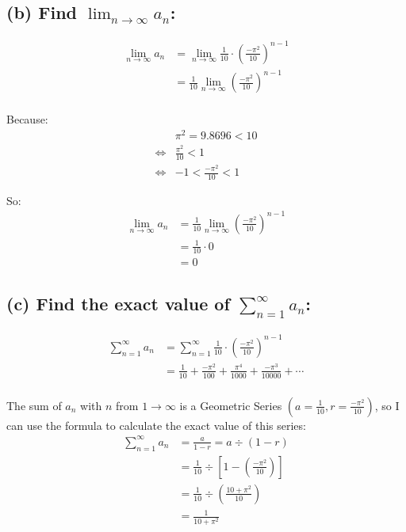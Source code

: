 \documentclass[12pt]{article}
\begin{document}
\subsection*{(b) Find $\displaystyle \lim_{n \rightarrow \infty} a_n$:}
\begin{align*}
    \lim_{n\to \infty} a_n &= \lim_{n\to \infty} \frac{1}{10}\cdot \left(\frac{-\pi^2}{10} \right)^{n-1} \\
    &=\frac{1}{10} \lim_{n\to \infty} \left(\frac{-\pi^2}{10} \right)^{n-1} \\
\end{align*}

Because:
\begin{align*}
    &\pi^2 = 9.8696 < 10\\
    \Longleftrightarrow & \frac{\pi^2}{10} < 1 \\
    \Longleftrightarrow & -1<\frac{-\pi^2}{10} < 1
\end{align*}

So:
\begin{align*}
    \lim_{n\to \infty} a_n &= 
    \frac{1}{10} \lim_{n\to \infty} \left(\frac{-\pi^2}{10} \right)^{n-1} \\
    &= \frac{1}{10}\cdot 0 \\
    &= 0
\end{align*}











\subsection*{(c) Find the exact value of $\displaystyle \sum_{n=1}^{\infty} a_n$:}
\begin{align*}
    \sum_{n=1}^{\infty} a_n
    &= \sum_{n=1}^{\infty} \frac{1}{10}\cdot \left( \frac{-\pi^2}{10} \right)^{n-1} \\
    &= \frac{1}{10} + \frac{-\pi^2}{100}+ \frac{\pi^4}{1000}+ \frac{-\pi^3}{10000}+ \cdots\\
\end{align*}

The sum of $a_n$ with $n$ from $1\to \infty$ is a Geometric Series $\left(a= \frac{1}{10}, r=\frac{-\pi^2}{10}\right)$, so I can use the formula to calculate the exact value of this series:
\begin{align*}
    \sum_{n=1}^{\infty} a_n &= \frac{a}{1-r}= a \div \left(1- r \right)\\
    &= \frac{1}{10}\div \left[ 1-\left( \frac{-\pi^2}{10} \right) \right]\\
    &= \frac{1}{10}\div \left(\frac{10+ \pi^2}{10} \right)\\
    &= \frac{1}{10+\pi^2}\\
\end{align*}
\end{document}

